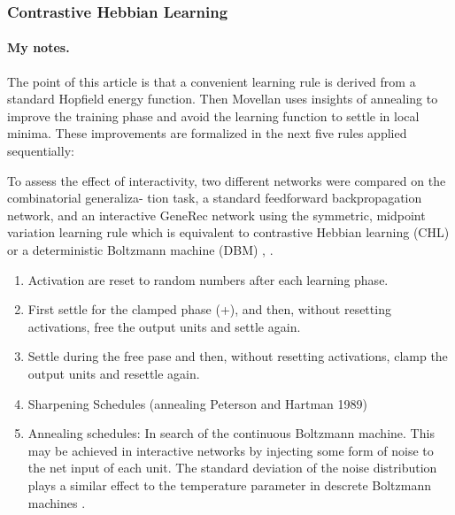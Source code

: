 \subsubsection{Contrastive Hebbian Learning}

\paragraph{My notes.}

The point of this article \citet{movellan1990contrastive} is that a convenient learning rule is derived from a standard Hopfield energy function. Then Movellan uses insights of annealing to improve the training phase and avoid the learning function to settle in local minima. These improvements are formalized in the next five rules applied sequentially:

To assess the effect of interactivity, two different networks were compared on the combinatorial generaliza-
tion task, a standard feedforward backpropagation network, and an interactive GeneRec network using the
symmetric, midpoint variation learning rule which is equivalent to contrastive Hebbian learning (CHL) or a
deterministic Boltzmann machine (DBM) \citet{o1996bio}, \citet{o2001generalization}. 

\begin{enumerate}
\item Activation are reset to random numbers after each learning phase. 

\item First settle for the clamped phase (+), and then, without resetting activations, free the output units and settle again. 

\item Settle during the free pase and then, without resetting activations, clamp the output units and resettle again. 

\item Sharpening Schedules (annealing Peterson and Hartman 1989)

\item Annealing schedules: In search of the continuous Boltzmann machine. This may be achieved in interactive networks by injecting some form of noise to the net input of each unit. The standard deviation of the noise distribution plays a similar effect to the temperature parameter in descrete Boltzmann machines \citet{movellan1990contrastive}. 
\end{enumerate}


